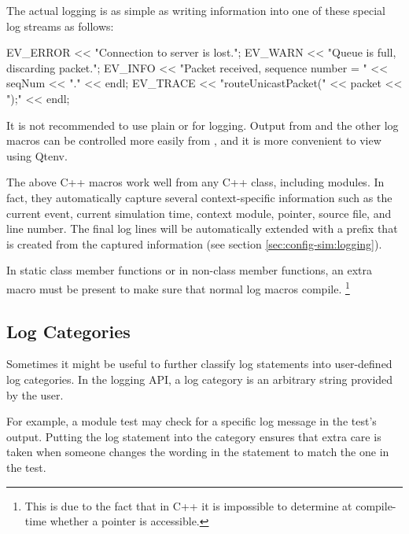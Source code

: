 The actual logging is as simple as writing information into one of these special
log streams as follows:

\begin{cpp}
EV_ERROR << "Connection to server is lost.\n";
EV_WARN << "Queue is full, discarding packet.\n";
EV_INFO << "Packet received, sequence number = " << seqNum << "." << endl;
EV_TRACE << "routeUnicastPacket(" << packet << ");" << endl;
\end{cpp}

\begin{note}
It is not recommended to use plain  or  for
logging. Output from  and the other log macros can be controlled
more easily from , and it is more convenient to view
using Qtenv.
\end{note}

The above C++ macros work well from any C++ class, including {\opp} modules. In
fact, they automatically capture several context-specific information such
as the current event, current simulation time, context module, 
pointer, source file, and line number. The final log lines will be automatically
extended with a prefix that is created from the captured information (see
section \ref{sec:config-sim:logging}).

In static class member functions or in non-class member functions, an extra
 macro must be present to make sure that normal log
macros compile. \footnote{This is due to the fact that in C++ it is impossible
to determine at compile-time whether a  pointer is accessible.}

\begin{cpp}
void findModule(const char *name, cModule *from)
{
    EV_STATICCONTEXT;
    EV_TRACE << "findModule(" << name << ", " << from << ");" << endl;
\end{cpp}

\subsection{Log Categories}
\label{sec:sim-lib:log-categories}

Sometimes it might be useful to further classify log statements into user-defined
log categories. In the {\opp} logging API, a log category is an
arbitrary string provided by the user.

For example, a module test may check for a specific log message in the test's
output. Putting the log statement into the  category ensures that
extra care is taken when someone changes the wording in the statement to match
the one in the test.

